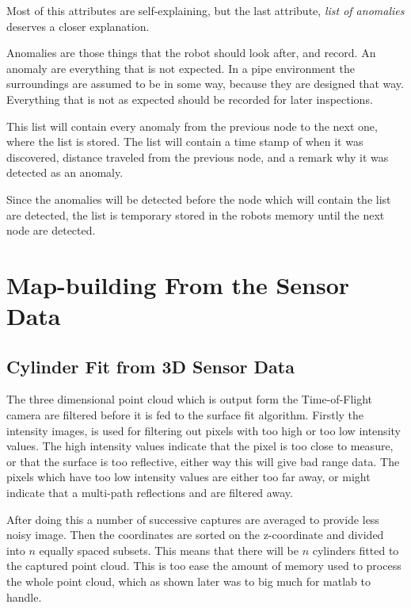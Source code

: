 Most of this attributes are self-explaining, but the last attribute, \emph{list of
anomalies} deserves a closer explanation. 

Anomalies are those things that the robot should look after, and record. An anomaly are
everything that is not expected. In a pipe environment the surroundings are assumed to be
in some way, because they are designed that way. Everything that is not as expected should
be recorded for later inspections. 

This list will contain every anomaly from the previous node to the next one, where the
list is stored. The list will contain a time stamp of when it was discovered, distance
traveled from the previous node, and a remark why it was detected as an anomaly. 

Since the anomalies will be detected before the node which will contain the list are
detected, the list is temporary stored in the robots memory until the next node are
detected. 


\section{Map-building From the Sensor Data}


\subsection{Cylinder Fit from 3D Sensor Data}
The three dimensional point cloud which is output form the Time-of-Flight camera are
filtered before it is fed to the surface fit algorithm. Firstly the intensity images, is
used for filtering out pixels with too high or too low intensity values. The high
intensity values indicate that the pixel is too close to measure, or that the surface is
too reflective, either way this will give bad range data. The pixels which have too low
intensity values are either too far away, or might indicate that a multi-path reflections
and are filtered away. 

After doing this a number of successive captures are averaged to provide less noisy image.
Then the coordinates are sorted on the z-coordinate and divided into $n$ equally spaced
subsets. This means that there will be $n$ cylinders fitted to the captured point cloud.
This is too ease the amount of memory used to process the whole point cloud, which as
shown later was to big much for matlab to handle. 

